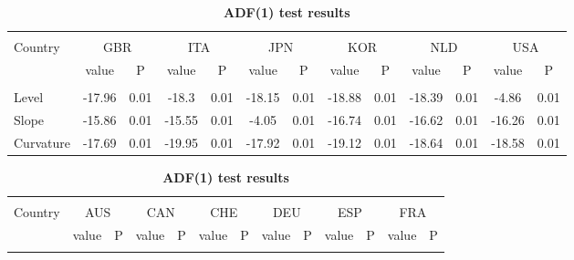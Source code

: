 \documentclass[12pt,bibliography=totoc]{article}
\begin{document}
\begin{appendices}
\begin{table}
\begin{subtable}[t]{1\textwidth}
\begin{tabular}{l cc cc cc cc cc cc}
\hline   \\ [-1.5ex]    

Country	&	\multicolumn{2}{c}{GBR}			&	\multicolumn{2}{c}{ITA}			&	\multicolumn{2}{c}{JPN}			&	\multicolumn{2}{c}{KOR}			&	\multicolumn{2}{c}{NLD}			&	\multicolumn{2}{c}{USA}			\\

 & value &P & value &P& value &P & value &P& value &P & value &P\\

\hline       \\ [-1.5ex] 

Level	&	-17.96 & 0.01 & -18.3 & 0.01 & -18.15 & 0.01 & -18.88 & 0.01 & -18.39 & 0.01 & -4.86 & 0.01	\\
Slope	&		-15.86 & 0.01 & -15.55 & 0.01 & -4.05 & 0.01 & -16.74 & 0.01 & -16.62 & 0.01 & -16.26 & 0.01	\\
Curvature	&	-17.69 & 0.01 & -19.95 & 0.01 & -17.92 & 0.01 & -19.12 & 0.01 & -18.64 & 0.01 & -18.58 & 0.01	\\



\hline
\end{tabular}
\caption{\textbf{ADF(1) test results}}
\end{subtable}
\hspace{\fill}
\bigskip 

\begin{subtable}[t]{1\textwidth}
\centering
\begin{tabular}{l cc cc cc cc cc cc}%
\hline\hline \\ [-1.5ex]                         %

Country	&	\multicolumn{2}{c}{AUS}			&	\multicolumn{2}{c}{CAN}			&	\multicolumn{2}{c}{CHE}			&	\multicolumn{2}{c}{DEU}			&	\multicolumn{2}{c}{ESP}			&	\multicolumn{2}{c}{FRA}			\\[0.5ex] 

 & value &P & value &P& value &P & value &P& value &P & value &P\\

\hline       \\ [-1.5ex] 


\end{tabular}
\end{subtable}
\end{table}
\end{appendices}
\end{document}
